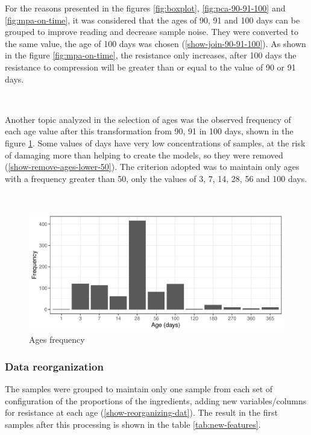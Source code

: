 \documentclass[
]{article}
\begin{document}
For the reasons presented in the figures \ref{fig:boxplot},
\ref{fig:pca-90-91-100} and \ref{fig:mpa-on-time}, it was considered
that the ages of 90, 91 and 100 days can be grouped to improve reading
and decrease sample noise. They were converted to the same value, the
age of 100 days was chosen (\ref{show-join-90-91-100}). As shown in the
figure \ref{fig:mpa-on-time}, the resistance only increases, after 100
days the resistance to compression will be greater than or equal to the
value of 90 or 91 days.

~

Another topic analyzed in the selection of ages was the observed
frequency of each age value after this transformation from 90, 91 in 100
days, shown in the figure \ref{fig:freq-ages}. Some values of days have
very low concentrations of samples, at the risk of damaging more than
helping to create the models, so they were removed
(\ref{show-remove-ages-lower-50}). The criterion adopted was to maintain
only ages with a frequency greater than 50, only the values of 3, 7, 14,
28, 56 and 100 days.

~

\begin{figure}

{\centering \includegraphics{paper_EN_files/figure-latex/freq-ages-1} 

}

\caption{Ages frequency}\label{fig:freq-ages}
\end{figure}

\hypertarget{data-reorganization}{%
\subsubsection{Data reorganization}\label{data-reorganization}}

The samples were grouped to maintain only one sample from each set of
configuration of the proportions of the ingredients, adding new
variables/columns for resistance at each age
(\ref{show-reorganizing-dat}). The result in the first samples after
this processing is shown in the table \ref{tab:new-features}.
\end{document}
